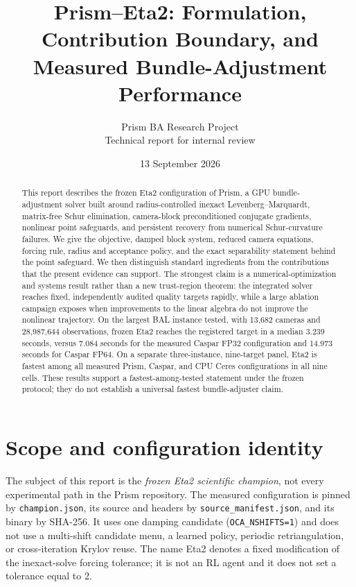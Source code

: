 \documentclass[10pt]{article}
\title{\vspace{-1.5em}\textbf{Prism--Eta2: Formulation, Contribution Boundary, and Measured Bundle-Adjustment Performance}}
\author{Prism BA Research Project\\\small Technical report for internal review}
\date{13 September 2026}
\begin{document}
\maketitle

\begin{abstract}
This report describes the frozen Eta2 configuration of Prism, a GPU bundle-adjustment solver built around radius-controlled inexact Levenberg--Marquardt, matrix-free Schur elimination, camera-block preconditioned conjugate gradients, nonlinear point safeguards, and persistent recovery from numerical Schur-curvature failures.  We give the objective, damped block system, reduced camera equations, forcing rule, radius and acceptance policy, and the exact separability statement behind the point safeguard.  We then distinguish standard ingredients from the contributions that the present evidence can support.  The strongest claim is a numerical-optimization and systems result rather than a new trust-region theorem: the integrated solver reaches fixed, independently audited quality targets rapidly, while a large ablation campaign exposes when improvements to the linear algebra do not improve the nonlinear trajectory.  On the largest BAL instance tested, with 13,682 cameras and 28,987,644 observations, frozen Eta2 reaches the registered target in a median 3.239 seconds, versus 7.084 seconds for the measured Caspar FP32 configuration and 14.973 seconds for Caspar FP64.  On a separate three-instance, nine-target panel, Eta2 is fastest among all measured Prism, Caspar, and CPU Ceres configurations in all nine cells.  These results support a fastest-among-tested statement under the frozen protocol; they do not establish a universal fastest bundle-adjuster claim.
\end{abstract}

\section{Scope and configuration identity}

The subject of this report is the \emph{frozen Eta2 scientific champion}, not every experimental path in the Prism repository.  The measured configuration is pinned by \texttt{champion.json}, its source and headers by \texttt{source\_manifest.json}, and its binary by SHA-256.  It uses one damping candidate (\texttt{OCA\_NSHIFTS=1}) and does not use a multi-shift candidate menu, a learned policy, periodic retriangulation, or cross-iteration Krylov reuse.  The name Eta2 denotes a fixed modification of the inexact-solve forcing tolerance; it is not an RL agent and it does not set a tolerance equal to 2.
\end{document}
